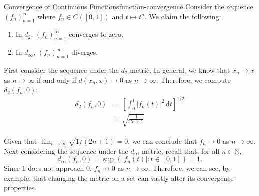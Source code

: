 \documentclass{article}
\numberwithin{equation}{section}
\numberwithin{figure}{section}
\begin{document}
\begin{example}{Convergence of Continuous Functions}{function-convergence}
    Consider the sequence $ \left( f_n \right)_{n=1}^\infty $ where $ f_n
    \in C\left( [0, 1] \right) $ and $ t \mapsto t^n $. We claim the
    following:

    \begin{enumerate}
        \item In $ d_2 $, $ \left(f_n\right)_{n=1}^\infty $ converges to
            zero;
        \item In $ d_\infty $, $ \left(f_n\right)_{n=1}^\infty $ diverges.
    \end{enumerate}
    First consider the sequence under the $ d_2 $ metric. In general, we
    know that $ x_n \to x $ as $ n \to \infty $ if and only if $ d(x_n, x)
    \to 0 $ as $ n \to \infty $. Therefore, we compute $ d_2(f_n, 0) $:
    \begin{align}
        d_2(f_n, 0) &= \left[ \int_0^1 \left\vert f_n(t) \right\vert^2 \,
            \mathrm{d}t \right]^{1/2} \\
        &= \sqrt{\frac{1}{2n+1}}
    \end{align}

    Given that $ \lim_{n \to \infty}\sqrt{1/(2n+1)} = 0 $, we can conclude that
    $ f_n \to 0 $ as $ n \to \infty $. Next considering the sequence under the
    $ d_\infty $ metric, recall that, for all $ n \in \mathbb{N} $,
    \begin{equation}
        d_\infty(f_n, 0) = \sup\left\{ \left\vert f_n(t) \right\vert \colon t
        \in [0, 1] \right\} = 1.
    \end{equation}
    Since $ 1 $ does not approach $ 0 $, $ f_n \not\to 0 $ as $ n \to \infty $.
    Therefore, we can see, by example, that changing the metric on a set can
    vastly alter its convergence properties.

    \centering
    \begingroup
        \tikzset{external/export=true}
    \endgroup
\end{example}
\end{document}

